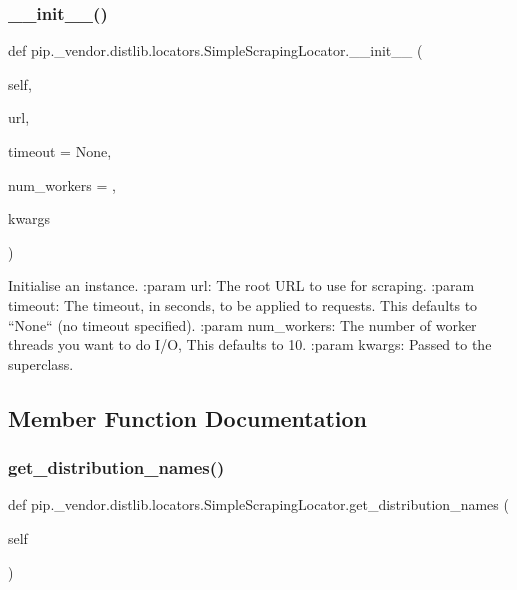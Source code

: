\subsubsection{\texorpdfstring{\+\_\+\+\_\+init\+\_\+\+\_\+()}{\_\_init\_\_()}}
{\footnotesize\ttfamily def pip.\+\_\+vendor.\+distlib.\+locators.\+Simple\+Scraping\+Locator.\+\_\+\+\_\+init\+\_\+\+\_\+ (\begin{DoxyParamCaption}\item[{}]{self,  }\item[{}]{url,  }\item[{}]{timeout = {\ttfamily None},  }\item[{}]{num\+\_\+workers = {},  }\item[{}]{kwargs }\end{DoxyParamCaption})}

\begin{DoxyVerb}Initialise an instance.
:param url: The root URL to use for scraping.
:param timeout: The timeout, in seconds, to be applied to requests.
        This defaults to ``None`` (no timeout specified).
:param num_workers: The number of worker threads you want to do I/O,
            This defaults to 10.
:param kwargs: Passed to the superclass.
\end{DoxyVerb}
 

\subsection{Member Function Documentation}
\mbox{\label{classpip_1_1__vendor_1_1distlib_1_1locators_1_1SimpleScrapingLocator_af143a81384c2795cedaa872936bfa8a5}} 
\subsubsection{\texorpdfstring{get\+\_\+distribution\+\_\+names()}{get\_distribution\_names()}}
{\footnotesize\ttfamily def pip.\+\_\+vendor.\+distlib.\+locators.\+Simple\+Scraping\+Locator.\+get\+\_\+distribution\+\_\+names (\begin{DoxyParamCaption}\item[{}]{self }\end{DoxyParamCaption})}

